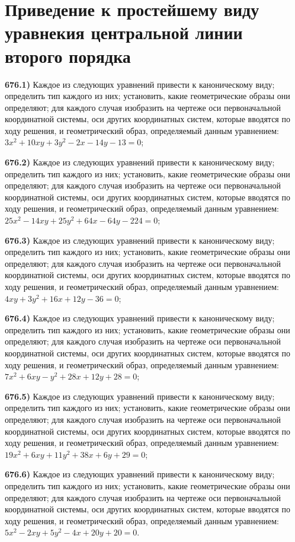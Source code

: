 \section{Приведение к простейшему виду уравнекия центральной линии второго порядка}



\textbf{676.1)} Каждое из следующих уравнений привести к каноническому виду; определить тип каждого из них; установить, какие геометрические образы они определяют; для каждого случая изобразить на чертеже оси первоначальной координатной системы, оси других координатных систем, которые вводятся по ходу решения, и геометрический образ, определяемый данным уравнением: $3 x^2+10 x y+3 y^2-2 x-14 y-13=0$;

\textbf{676.2)} Каждое из следующих уравнений привести к каноническому виду; определить тип каждого из них; установить, какие геометрические образы они определяют; для каждого случая изобразить на чертеже оси первоначальной координатной системы, оси других координатных систем, которые вводятся по ходу решения, и геометрический образ, определяемый данным уравнением: $25 x^2-14 x y+25 y^2+64 x-64 y-224=0$;

\textbf{676.3)} Каждое из следующих уравнений привести к каноническому виду; определить тип каждого из них; установить, какие геометрические образы они определяют; для каждого случая изобразить на чертеже оси первоначальной координатной системы, оси других координатных систем, которые вводятся по ходу решения, и геометрический образ, определяемый данным уравнением: $4 x y+3 y^2+16 x+12 y-36=0$;

\textbf{676.4)} Каждое из следующих уравнений привести к каноническому виду; определить тип каждого из них; установить, какие геометрические образы они определяют; для каждого случая изобразить на чертеже оси первоначальной координатной системы, оси других координатных систем, которые вводятся по ходу решения, и геометрический образ, определяемый данным уравнением: $7 x^2+6 x y-y^2+28 x+12 y+28=0$;

\textbf{676.5)} Каждое из следующих уравнений привести к каноническому виду; определить тип каждого из них; установить, какие геометрические образы они определяют; для каждого случая изобразить на чертеже оси первоначальной координатной системы, оси других координатных систем, которые вводятся по ходу решения, и геометрический образ, определяемый данным уравнением: $19 x^2+6 x y+11 y^2+38 x+6 y+29=0$;

\textbf{676.6)} Каждое из следующих уравнений привести к каноническому виду; определить тип каждого из них; установить, какие геометрические образы они определяют; для каждого случая изобразить на чертеже оси первоначальной координатной системы, оси других координатных систем, которые вводятся по ходу решения, и геометрический образ, определяемый данным уравнением: $5 x^2-2 x y+5 y^2-4 x+20 y+20=0$.

